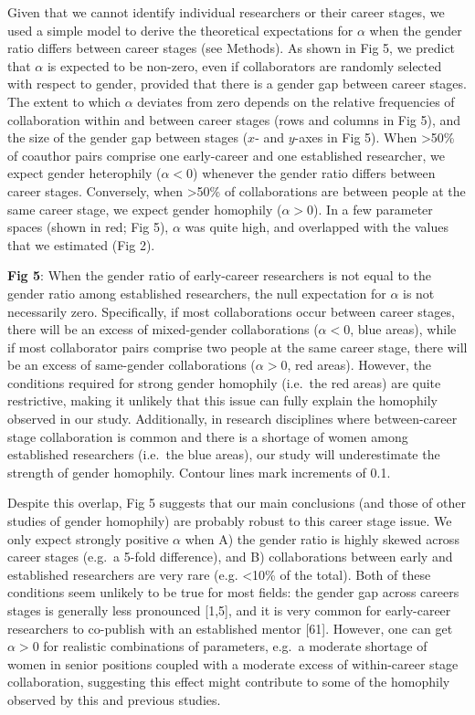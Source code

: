 \documentclass[12pt,]{article}
\begin{document}
Given that we cannot identify individual researchers or their career
stages, we used a simple model to derive the theoretical expectations
for \(\alpha\) when the gender ratio differs between career stages (see
Methods). As shown in Fig 5, we predict that \(\alpha\) is expected to
be non-zero, even if collaborators are randomly selected with respect to
gender, provided that there is a gender gap between career stages. The
extent to which \(\alpha\) deviates from zero depends on the relative
frequencies of collaboration within and between career stages (rows and
columns in Fig 5), and the size of the gender gap between stages (\(x\)-
and \(y\)-axes in Fig 5). When \textgreater{}50\% of coauthor pairs
comprise one early-career and one established researcher, we expect
gender heterophily (\(\alpha < 0\)) whenever the gender ratio differs
between career stages. Conversely, when \textgreater{}50\% of
collaborations are between people at the same career stage, we expect
gender homophily (\(\alpha > 0\)). In a few parameter spaces (shown in
red; Fig 5), \(\alpha\) was quite high, and overlapped with the values
that we estimated (Fig 2).

\vspace{2cm}

\textbf{Fig 5}: When the gender ratio of early-career researchers is not
equal to the gender ratio among established researchers, the null
expectation for \(\alpha\) is not necessarily zero. Specifically, if
most collaborations occur between career stages, there will be an excess
of mixed-gender collaborations (\(\alpha < 0\), blue areas), while if
most collaborator pairs comprise two people at the same career stage,
there will be an excess of same-gender collaborations (\(\alpha > 0\),
red areas). However, the conditions required for strong gender homophily
(i.e.~the red areas) are quite restrictive, making it unlikely that this
issue can fully explain the homophily observed in our study.
Additionally, in research disciplines where between-career stage
collaboration is common and there is a shortage of women among
established researchers (i.e.~the blue areas), our study will
underestimate the strength of gender homophily. Contour lines mark
increments of 0.1. \vspace{2cm}

Despite this overlap, Fig 5 suggests that our main conclusions (and
those of other studies of gender homophily) are probably robust to this
career stage issue. We only expect strongly positive \(\alpha\) when A)
the gender ratio is highly skewed across career stages (e.g.~a 5-fold
difference), and B) collaborations between early and established
researchers are very rare (e.g. \textless{}10\% of the total). Both of
these conditions seem unlikely to be true for most fields: the gender
gap across careers stages is generally less pronounced {[}1,5{]}, and it
is very common for early-career researchers to co-publish with an
established mentor {[}61{]}. However, one can get \(\alpha > 0\) for
realistic combinations of parameters, e.g.~a moderate shortage of women
in senior positions coupled with a moderate excess of within-career
stage collaboration, suggesting this effect might contribute to some of
the homophily observed by this and previous studies.
\end{document}
